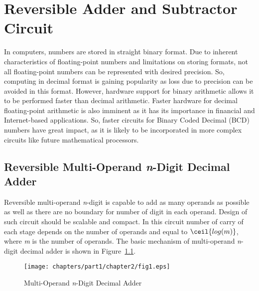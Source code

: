 

\renewcommand{\shortchaptertitle}{Reversible Adder and Subtractor Circuit}
\chapter{Reversible Adder and Subtractor Circuit}
\label{ch:p3__chapter2}


In computers, numbers are stored in straight binary format. Due to inherent characteristics of floating-point numbers and limitations on storing formats, not all floating-point numbers can be represented with desired precision. So, computing in decimal format is gaining popularity as loss due to precision can be avoided in this format. However, hardware support for binary arithmetic allows it to be performed faster than decimal arithmetic. Faster hardware for decimal floating-point arithmetic is also imminent as it has its importance in financial and Internet-based applications. So, faster circuits for Binary Coded Decimal (BCD) numbers have great impact, as it is likely to be incorporated in more complex circuits like future mathematical processors.
\section{Reversible Multi-Operand {\it n}-Digit Decimal Adder}

 Reversible multi-operand {\it n}-digit is capable to add as many operands as possible as well as there are no boundary for number of digit in each operand. Design of such circuit should be scalable and compact. In this circuit number of carry of each stage depends on the number of operands and equal to $\ceil{log(m)}$, where {\it m} is the number of operands. The basic mechanism of multi-operand {\it n}-digit decimal adder is shown in Figure~\ref{fig:p1_c2_fig1}. 
 
 \begin{figure}[!tbh]
 	\centering
 	\texttt{[image: chapters/part1/chapter2/fig1.eps]}
 	\caption{Multi-Operand {\it n}-Digit Decimal Adder}
 	\label{fig:p1_c2_fig1}
 \end{figure}

